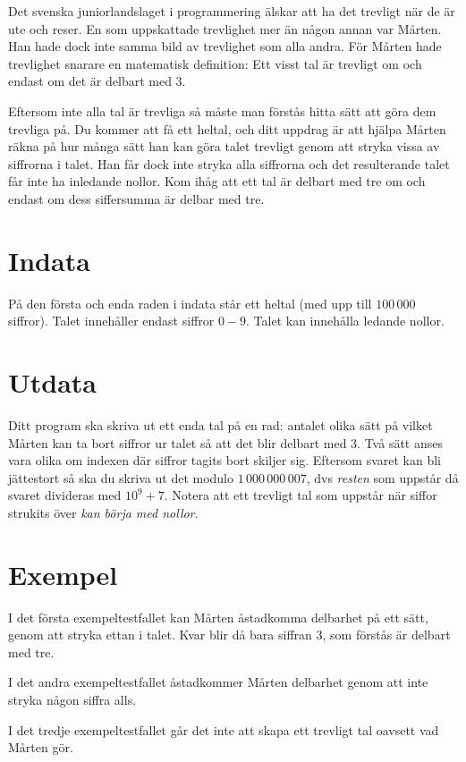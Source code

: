 Det svenska juniorlandslaget i programmering älskar att ha det trevligt när de är ute och reser. En som uppskattade trevlighet mer än någon annan var Mårten. Han hade dock inte samma bild av trevlighet som alla andra. För Mårten hade trevlighet snarare en matematisk definition: Ett visst tal är trevligt om och endast om det är delbart med 3.

Eftersom inte alla tal är trevliga så måste man förstås hitta sätt att göra dem trevliga på. Du kommer att få ett heltal, och ditt uppdrag är att hjälpa Mårten räkna på hur många sätt han kan göra talet trevligt genom att stryka vissa av siffrorna i talet. Han får dock inte stryka alla siffrorna och det resulterande talet får inte ha inledande nollor. Kom ihåg att ett tal är delbart med tre om och endast om dess siffersumma är delbar med tre. 

\section*{Indata}
På den första och enda raden i indata står ett heltal (med upp till $100\,000$ siffror). Talet innehåller endast siffror $0-9$. Talet kan innehålla ledande nollor.

\section*{Utdata}
Ditt program ska skriva ut ett enda tal på en rad: antalet olika sätt på vilket Mårten kan ta bort siffror ur talet så att det blir delbart med 3. Två sätt anses vara olika om indexen där siffror tagits bort skiljer sig. Eftersom svaret kan bli jättestort så ska du skriva ut det modulo $1\,000\,000\,007$, dvs \emph{resten} som uppstår då svaret divideras med $10^9 + 7$. Notera att ett trevligt tal som uppstår när siffor strukits över \emph{kan börja med nollor}.

\section*{Exempel}
I det första exempeltestfallet kan Mårten åstadkomma delbarhet på ett sätt, genom att stryka ettan i talet. Kvar blir då bara siffran 3, som förstås är delbart med tre.

I det andra exempeltestfallet åstadkommer Mårten delbarhet genom att inte stryka någon siffra alls.

I det tredje exempeltestfallet går det inte att skapa ett trevligt tal oavsett vad Mårten gör.

